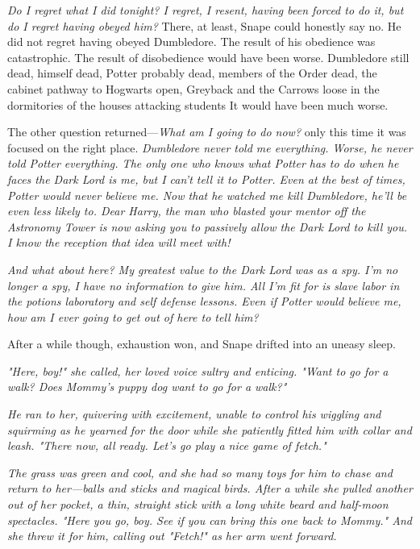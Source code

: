 \emph{Do I regret what I did tonight? I regret, I resent, having been forced to do it, but do I regret having obeyed him?} There, at least, Snape could honestly say no. He did not regret having obeyed Dumbledore. The result of his obedience was catastrophic. The result of disobedience would have been worse. Dumbledore still dead, himself dead, Potter probably dead, members of the Order dead, the cabinet pathway to Hogwarts open, Greyback and the Carrows loose in the dormitories of the houses attacking students{\el} It would have been much worse.

The other question returned—\emph{What am I going to do now?} only this time it was focused on the right place. \emph{Dumbledore never told me everything. Worse, he never told Potter everything. The only one who knows what Potter has to do when he faces the Dark Lord is me, but I can't tell it to Potter. Even at the best of times, Potter would never believe me. Now that he watched me kill Dumbledore, he'll be even less likely to. Dear Harry, the man who blasted your mentor off the Astronomy Tower is now asking you to passively allow the Dark Lord to kill you. I know the reception that idea will meet with!}

\emph{And what about here? My greatest value to the Dark Lord was as a spy. I'm no longer a spy, I have no information to give him. All I'm fit for is slave labor in the potions laboratory and self defense lessons. Even if Potter would believe me, how am I ever going to get out of here to tell him?}

After a while though, exhaustion won, and Snape drifted into an uneasy sleep.

\sbreak

\emph{"Here, boy!" she called, her loved voice sultry and enticing. "Want to go for a walk? Does Mommy's puppy dog want to go for a walk?"}

\emph{He ran to her, quivering with excitement, unable to control his wiggling and squirming as he yearned for the door while she patiently fitted him with collar and leash. "There now, all ready. Let's go play a nice game of fetch."}

\emph{The grass was green and cool, and she had so many toys for him to chase and return to her—balls and sticks and magical birds. After a while she pulled another out of her pocket, a thin, straight stick with a long white beard and half-moon spectacles. "Here you go, boy. See if you can bring this one back to Mommy." And she threw it for him, calling out "Fetch!" as her arm went forward.}

